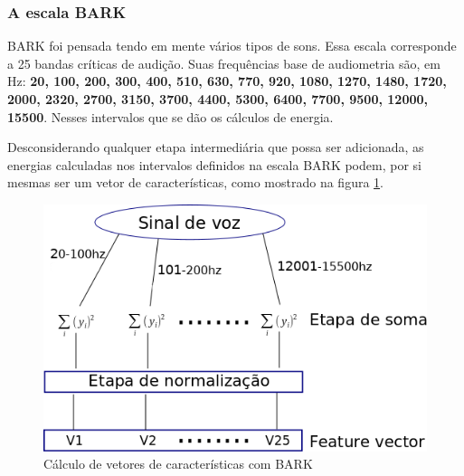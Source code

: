 	\subsubsection{A escala BARK}
		\par BARK foi pensada tendo em mente vários tipos de sons. Essa escala corresponde a 25 bandas críticas de audição. Suas frequências base de audiometria são, em Hz: \textbf{20, 100, 200, 300, 400, 510, 630, 770, 920, 1080, 1270, 1480, 1720, 2000, 2320, 2700, 3150, 3700, 4400, 5300, 6400, 7700, 9500, 12000, 15500}. Nesses intervalos que se dão os cálculos de energia.
		\par Desconsiderando qualquer etapa intermediária que possa ser adicionada, as energias calculadas nos intervalos definidos na escala BARK podem, por si mesmas ser um vetor de características, como mostrado na figura \ref{fig:barkfeaturevect}.
		\begin{figure}[h]
			\centering
			\includegraphics[width=0.6\linewidth]{images/barkFeatureVect}
			\caption{Cálculo de vetores de características com BARK}
			\label{fig:barkfeaturevect}
		\end{figure}
